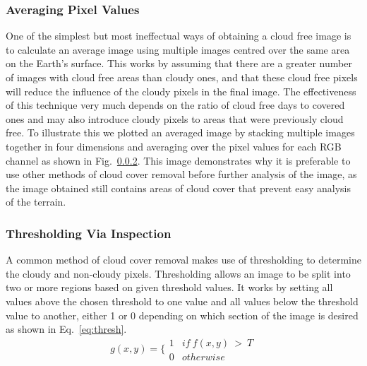 \subsubsection{Averaging Pixel Values}
 One of the simplest but most ineffectual ways of obtaining a cloud free image is to calculate an average image using multiple images centred over the same area on the Earth's surface. This works by assuming that there are a greater number of images with cloud free areas than cloudy ones, and that these cloud free pixels will reduce the influence of the cloudy pixels in the final image. The effectiveness of this technique very much depends on the ratio of cloud free days to covered ones and may also introduce cloudy pixels to areas that were previously cloud free. To illustrate this we plotted an averaged image by stacking multiple images together in four dimensions and averaging over the pixel values for each RGB channel as shown in Fig.~\ref{}. This image demonstrates why it is preferable to use other methods of cloud cover removal before further analysis of the image, as the image obtained still contains areas of cloud cover that prevent easy analysis of the terrain.
\subsubsection{Thresholding Via Inspection}
 A common method of cloud cover removal makes use of thresholding to determine the cloudy and non-cloudy pixels. Thresholding allows an image to be split into two or more regions based on given threshold values. It works by setting all values above the chosen threshold to one value and all values below the threshold value to another, either 1 or 0 depending on which section of the image is desired as shown in Eq.~\ref{eq:thresh}.
 \begin{equation}\label{eq:thresh}
     g(x,y)=\Big\{\begin{matrix}
1 & if~f(x,y)~>~ T\\
0 & otherwise
\end{matrix}
 \end{equation}
 
